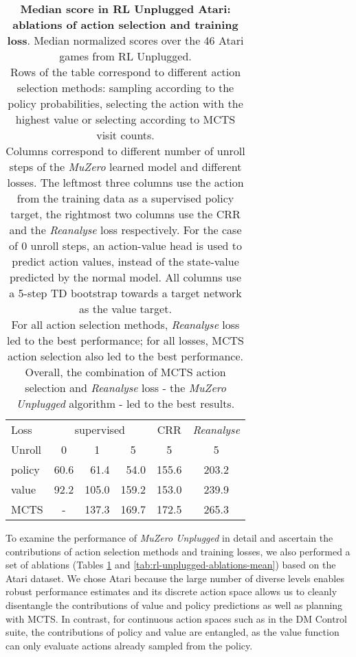 \documentclass{article}
\newcommand{\muzero}{\emph{MuZero}}
\newcommand{\reanalyse}{\emph{Reanalyse}}
\newcommand{\mzunplugged}{\emph{MuZero Unplugged}}
\begin{document}
\begin{table}[t]
\begin{center}\begin{tabularx}{\columnwidth}{l|rrrcc}
\toprule
Loss &  \multicolumn{3}{c}{supervised} & CRR & \reanalyse{} \\
Unroll & \multicolumn{1}{c}{0} & \multicolumn{1}{c}{1}  & \multicolumn{1}{c}{5} & 5 & 5 \\
\midrule
policy & 60.6 & 61.4 & 54.0 & 155.6 & 203.2\\
value & 92.2 & 105.0 & 159.2 & 153.0 & 239.9\\
MCTS &  \multicolumn{1}{c}{-}  & 137.3 & 169.7 & 172.5 & 265.3\\
\bottomrule
\end{tabularx}
\end{center}
 \caption{
\label{tab:rl-unplugged-ablations}
\textbf{Median score in RL Unplugged Atari: ablations of action selection and training loss}. Median normalized scores over the 46 Atari games from RL Unplugged. \\
Rows of the table correspond to different action selection methods: sampling according to the policy probabilities, selecting the action with the highest value or selecting according to MCTS visit counts.\\
Columns correspond to different number of unroll steps of the \muzero{} learned model and different losses. The leftmost three columns use the action from the training data as a supervised policy target, the rightmost two columns use the CRR and the \reanalyse{} loss respectively. For the case of 0 unroll steps, an action-value head is used to predict action values, instead of the state-value predicted by the normal model. All columns use a 5-step TD bootstrap towards a target network as the value target.\\
For all action selection methods, \reanalyse{} loss led to the best performance; for all losses, MCTS action selection also led to the best performance. Overall, the combination of MCTS action selection and \reanalyse{} loss - the \mzunplugged{} algorithm - led to the best results.
}
\end{table}


To examine the performance of \mzunplugged{} in detail and ascertain the contributions of action selection methods and training losses, we also performed a set of ablations (Tables \ref{tab:rl-unplugged-ablations} and \ref{tab:rl-unplugged-ablations-mean}) based on the Atari dataset. We chose Atari because the large number of diverse levels enables robust performance estimates and its discrete action space allows us to cleanly disentangle the contributions of value and policy predictions as well as planning with MCTS. In contrast, for continuous action spaces such as in the DM Control suite, the contributions of policy and value are entangled, as the value function can only evaluate actions already sampled from the policy.
\end{document}

